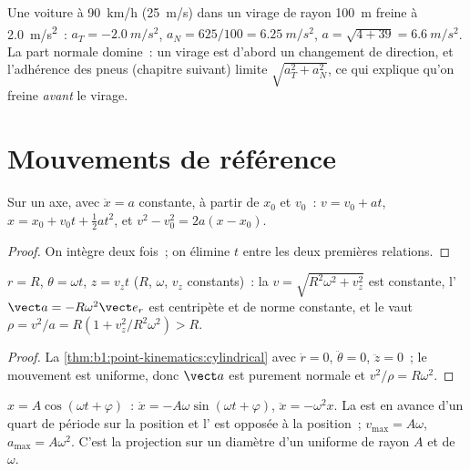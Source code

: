 \begin{example}\label{ex:b1:point-kinematics:bend}
Une voiture à \qty{90}{km/h} (\qty{25}{m/s}) dans un virage de rayon
\qty{100}{m} freine à \qty{2.0}{m/s^2}~: $a_T = \qty{-2.0}{m/s^2}$, $a_N = 625/100 =
\qty{6.25}{m/s^2}$, $a = \sqrt{4 + 39} = \qty{6.6}{m/s^2}$. La part
normale domine~: un virage est d'abord un changement de direction, et
l'adhérence des pneus (chapitre suivant) limite $\sqrt{a_T^2 + a_N^2}$,
ce qui explique qu'on freine \emph{avant} le virage.
\end{example}

\section{Mouvements de référence}

\begin{proposition}\label{prop:b1:point-kinematics:uarm}
Sur un axe, avec $\ddot x = a$ constante, à partir de $x_0$ et $v_0$~:
$v = v_0 + at$, $x = x_0 + v_0t + \tfrac12 at^2$, et
$v^2 - v_0^2 = 2a(x - x_0)$.
\end{proposition}

\begin{proof}
On intègre deux fois~; on élimine $t$ entre les deux premières relations.
\end{proof}

\begin{proposition}\label{prop:b1:point-kinematics:helix}
$r = R$, $\theta = \omega t$, $z = v_zt$ ($R$, $\omega$, $v_z$
constants)~: la  $v = \sqrt{R^2\omega^2 + v_z^2}$ est constante,
l' $\vect a = -R\omega^2\vect e_r$ est centripète et de norme
constante, et le  vaut $\rho = v^2/a = R(1 + v_z^2/R^2\omega^2) > R$.
\end{proposition}

\begin{proof}
La \cref{thm:b1:point-kinematics:cylindrical} avec $\dot r = 0$,
$\ddot\theta = 0$, $\ddot z = 0$~; le mouvement est uniforme, donc
$\vect a$ est purement normale et $v^2/\rho = R\omega^2$.
\end{proof}

\begin{proposition}\label{prop:b1:point-kinematics:harmonic}
$x = A\cos(\omega t + \varphi)$~: $\dot x = -A\omega\sin(\omega t + \varphi)$,
$\ddot x = -\omega^2 x$. La  est en avance d'un quart de période
sur la position et l' est opposée à la position~; $v_{\max} =
A\omega$, $a_{\max} = A\omega^2$. C'est la projection sur un diamètre
d'un  uniforme de rayon $A$ et de 
$\omega$.
\end{proposition}

